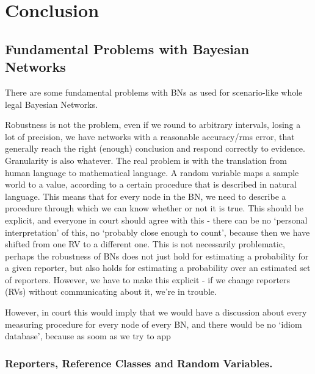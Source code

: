  

\chapter[Conclusion]{Conclusion}

\section{Fundamental Problems with Bayesian Networks}

There are some fundamental problems with BNs as used for scenario-like whole legal Bayesian Networks.

Robustness is not the problem, even if we round to arbitrary intervals, losing a lot of precision, we have networks with a reasonable accuracy/rms error, that generally reach the right (enough) conclusion and respond correctly to evidence. Granularity is also whatever. The real problem is with the translation from human language to mathematical language. A random variable maps a sample world to a value, according to a certain procedure that is described in natural language. This means that for every node in the BN, we need to describe a procedure through which we can know whether or not it is true. This should be explicit, and everyone in court should agree with this - there can be no `personal interpretation' of this, no `probably close enough to count', because then we have shifted from one RV to a different one. This is not necessarily problematic, perhaps the robustness of BNs does not just hold for estimating a probability for a given reporter, but also holds for estimating a probability over an estimated set of reporters. However, we have to make this explicit - if we change reporters (RVs) without communicating about it, we're in trouble. 

However, in court this would imply that we would have a discussion about every measuring procedure for every node of every BN, and there would be no `idiom database', because as soom as we try to app
\subsection{Reporters, Reference Classes and Random Variables.}

